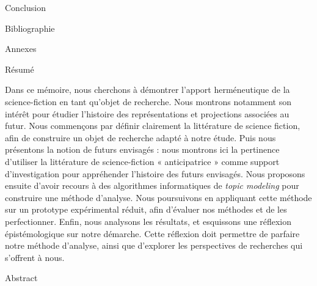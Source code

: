 \documentclass[letterpaper,portrait,12pt]{article}
\begin{document}
Conclusion








Bibliographie








Annexes


{\huge R\'{e}sum\'{e}}





Dans ce m\'{e}moire, nous cherchons \`{a} d\'{e}montrer l'apport herm\'{e}neutique de la science-fiction en tant qu'objet de recherche. Nous montrons notamment son int\'{e}r\^{e}t pour \'{e}tudier l'histoire des repr\'{e}sentations et projections associ\'{e}es au futur. Nous commen\c{c}ons par d\'{e}finir clairement la litt\'{e}rature de science fiction, afin de construire un objet de recherche adapt\'{e} \`{a} notre \'{e}tude. Puis nous pr\'{e}sentons la notion de futurs envisag\'{e}s : nous montrons ici la pertinence d'utiliser la litt\'{e}rature de science-fiction « anticipatrice » comme support d'investigation pour appr\'{e}hender l'histoire des futurs envisag\'{e}s. Nous proposons ensuite d'avoir recours \`{a} des algorithmes informatiques de \emph{topic modeling} pour construire une m\'{e}thode d'analyse. Nous poursuivons en appliquant cette m\'{e}thode sur  un prototype exp\'{e}rimental r\'{e}duit, afin d'\'{e}valuer nos m\'{e}thodes et de les perfectionner. Enfin, nous analysons les r\'{e}sultats, et esquissons une r\'{e}flexion \'{e}pist\'{e}mologique sur notre d\'{e}marche. Cette r\'{e}flexion doit permettre de parfaire notre m\'{e}thode d'analyse, ainsi que d'explorer les perspectives de recherches qui s'offrent \`{a} nous.





Abstract
\end{document}
